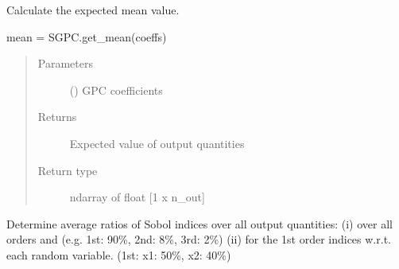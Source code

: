 \documentclass[letterpaper,10pt,english,openany,oneside]{sphinxmanual}
\begin{document}
\begin{fulllineitems}
\begin{fulllineitems}
\begin{quote}
\begin{description}
\end{description}\end{quote}

\end{fulllineitems}


\begin{fulllineitems}
\label{\detokenize{pygpc:pygpc.SGPC.SGPC.get_mean}}
Calculate the expected mean value.

mean = SGPC.get\_mean(coeffs)
\begin{quote}\begin{description}
\item[{Parameters}] \leavevmode
{} (\sphinxstyleliteralemphasis{\sphinxupquote{ {[}}}\sphinxstyleliteralemphasis{\sphinxupquote{{]}}}) \textendash{} GPC coefficients

\item[{Returns}] \leavevmode
{} \textendash{} Expected value of output quantities

\item[{Return type}] \leavevmode
ndarray of float {[}1 x n\_out{]}

\end{description}\end{quote}

\end{fulllineitems}


\begin{fulllineitems}
\label{\detokenize{pygpc:pygpc.SGPC.SGPC.get_sobol_composition}}
Determine average ratios of Sobol indices over all output quantities:
(i) over all orders and (e.g. 1st: 90\%, 2nd: 8\%, 3rd: 2\%)
(ii) for the 1st order indices w.r.t. each random variable. (1st: x1: 50\%, x2: 40\%)


\end{fulllineitems}
\end{fulllineitems}
\end{document}
